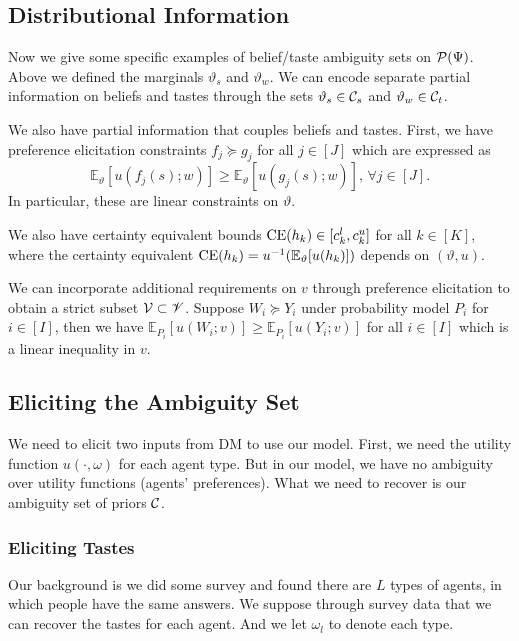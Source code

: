 \documentclass[11pt,oneside]{article}
\theoremstyle{plain}
\theoremstyle{plain}
\theoremstyle{plain}
\theoremstyle{plain}
\theoremstyle{plain}
\theoremstyle{definition}
\theoremstyle{definition}
\theoremstyle{remark}
\theoremstyle{plain}
\def\bbe{{\mathbb{E}}}
\newcommand{\calppsi}{{\cal P}(\Psi)}
\begin{document}
\subsection{Distributional Information}

Now we give some specific examples of belief/taste ambiguity sets on $\calppsi$.
Above we defined the marginals $\vartheta_s$ and $\vartheta_w$.
We can encode separate partial information on beliefs and tastes through the sets $\vartheta_s \in {\cal C}_s$ and $\vartheta_w \in {\cal C}_t$.

We also have partial information that couples beliefs and tastes.
First, we have preference elicitation constraints $f_j \succeq g_j$ for all $j \in [J]$ which are expressed as 
$$
\bbe_{\vartheta}[u(f_j(s); w)] \geq \bbe_{\vartheta}[u(g_j(s); w)],\, \forall j \in [J].
$$
In particular, these are linear constraints on $\vartheta$.

We also have certainty equivalent bounds ${\rm CE}(h_k) \in [c_k^l, c_k^u]$ for all $k \in [K]$, where the certainty equivalent ${\rm CE}(h_k) = u^{-1}(\bbe_{\vartheta}[u(h_k)])$ depends on $(\vartheta, u)$.

We can incorporate additional requirements on $v$ through preference elicitation to obtain a strict subset ${\cal V} \subset \mathscr{V}$. Suppose $W_i \succeq Y_i$ under probability model $P_i$ for $i \in [I]$, then we have $\mathbb{E}_{P_i}[u(W_i; v)] \geq \mathbb{E}_{P_i}[u(Y_i; v)]$ for all $i \in [I]$ which is a linear inequality in $v$.

\subsection{Eliciting the Ambiguity Set}

We need to elicit two inputs from DM to use our model. First, we need the utility function $u(\cdot,\omega)$ for each agent type.
But in our model, we have no ambiguity over utility functions (agents' preferences). What we need to recover is our ambiguity set of priors ${\cal C}$.

\subsubsection{Eliciting Tastes}

Our background is we did some survey and found there are $L$ types of agents, in which people have the same answers. We suppose through survey data that we can recover the tastes for each agent.
And we let $\omega_l$ to denote each type.
\end{document}
